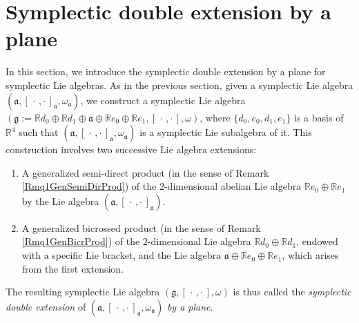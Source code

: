 \documentclass[final,1p,times,nopreprintline]{elsarticle}
\theoremstyle{definition}
\numberwithin{equation}{section}
\newcommand{\rel}{\mathbb{R}}
\newcommand{\w}{\omega}
\newcommand{\g}{\mathfrak{g}}
\newcommand{\ai}{\mathfrak{a}}
\numberwithin{equation}{section}
\newcommand{\cro}{[\,\cdot\,,\cdot\,]}
\begin{document}
\section{Symplectic double extension by a plane}\label{Section3}
In this section, we introduce the symplectic double extension by a plane for symplectic Lie algebras. As in the previous section, given a symplectic Lie algebra $(\ai,\cro_\ai,\w_\ai)$, we construct a symplectic Lie algebra $(\g:=\rel d_0\oplus\rel d_1\oplus\ai\oplus\rel e_0\oplus\rel e_1,\cro,\w)$, where $\{d_0,e_0,d_1,e_1\}$ is a basis of $\rel^4$ such that $(\ai,\cro_\ai,\w_\ai)$ is a symplectic Lie subalgebra of it. This construction involves two successive Lie algebra extensions:
\begin{enumerate}
	\item A generalized semi-direct product (in the sense of Remark \ref{Rmq1GenSemiDirProd}) of the $2$-dimensional abelian Lie algebra $\rel e_0\oplus\rel e_1$ by the Lie algebra $(\ai,\cro_\ai)$. 
	\item A generalized bicrossed product (in the sense of Remark \ref{Rmq1GenBicrProd}) of the $2$-dimensional Lie algebra $\rel d_0 \oplus \rel d_1$, endowed with a specific Lie bracket, and the Lie algebra $\ai \oplus \rel e_0 \oplus \rel e_1$, which arises from the first extension. 
\end{enumerate}
The resulting symplectic Lie algebra $(\g, \cro,\w)$ is thus called the \textit{symplectic double extension} of $(\ai,\cro_\ai,\w_\ai)$ \textit{by a plane}.
\end{document}
